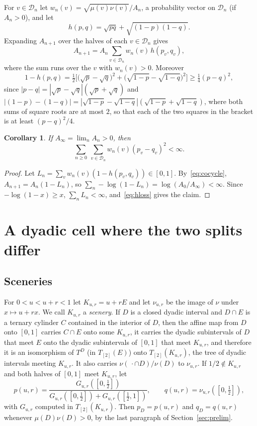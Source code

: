 \documentclass[11pt]{amsart}
\newtheorem{corollary}[theorem]{Corollary}
\theoremstyle{remark}
\newcommand{\cD}{\mathcal D}
\begin{document}
For $v\in\cD_n$ let $w_n(v)=\sqrt{\mu(v)\nu(v)}/A_n$, a probability vector on $\cD_n$ (if $A_n>0$), and let
\[
h(p,q)=\sqrt{pq}+\sqrt{(1-p)(1-q)}.
\]
Expanding $A_{n+1}$ over the halves of each $v\in\cD_n$ gives
\begin{equation}\label{eq:cocycle}
A_{n+1}=A_n\sum_{v\in\cD_n}w_n(v)\,h(p_v,q_v),
\end{equation}
where the sum runs over the $v$ with $w_n(v)>0$. Moreover
\begin{equation}\label{eq:hloss}
1-h(p,q)=\tfrac12\Big[\big(\sqrt p-\sqrt q\big)^2+\big(\sqrt{1-p}-\sqrt{1-q}\big)^2\Big]\ge\tfrac14(p-q)^2,
\end{equation}
since $|p-q|=|\sqrt p-\sqrt q|(\sqrt p+\sqrt q)$ and $|(1-p)-(1-q)|=|\sqrt{1-p}-\sqrt{1-q}|(\sqrt{1-p}+\sqrt{1-q})$, where both sums of square roots are at most $2$, so that each of the two squares in the bracket is at least $(p-q)^2/4$.

\begin{corollary}\label{cor:finite-series}
If $A_\infty=\lim_nA_n>0$, then
\[
\sum_{n\ge0}\ \sum_{v\in\cD_n}w_n(v)(p_v-q_v)^2<\infty.
\]
\end{corollary}

\begin{proof}
Let $L_n=\sum_vw_n(v)(1-h(p_v,q_v))\in[0,1]$. By~\eqref{eq:cocycle}, $A_{n+1}=A_n(1-L_n)$, so $\sum_n-\log(1-L_n)=\log(A_0/A_\infty)<\infty$. Since $-\log(1-x)\ge x$, $\sum_nL_n<\infty$, and~\eqref{eq:hloss} gives the claim.
\end{proof}

\section{A dyadic cell where the two splits differ}\label{sec:gap}

\subsection*{Sceneries}
For $0<u<u+r<1$ let $K_{u,r}=u+rE$ and let $\nu_{u,r}$ be the image of $\nu$ under $x\mapsto u+rx$. We call $K_{u,r}$ a \emph{scenery}. If $D$ is a closed dyadic interval and $D\cap E$ is a ternary cylinder $C$ contained in the interior of $D$, then the affine map from $D$ onto $[0,1]$ carries $C\cap E$ onto some $K_{u,r}$, it carries the dyadic subintervals of $D$ that meet $E$ onto the dyadic subintervals of $[0,1]$ that meet $K_{u,r}$, and therefore it is an isomorphism of $T^D$ (in $T_{[2]}(E)$) onto $T_{[2]}(K_{u,r})$, the tree of dyadic intervals meeting $K_{u,r}$. It also carries $\nu(\,\cdot\cap D)/\nu(D)$ to $\nu_{u,r}$. If $1/2\notin K_{u,r}$ and both halves of $[0,1]$ meet $K_{u,r}$, let
\[
p(u,r)=\frac{G_{u,r}([0,\tfrac12])}{G_{u,r}([0,\tfrac12])+G_{u,r}([\tfrac12,1])},\qquad q(u,r)=\nu_{u,r}([0,\tfrac12]),
\]
with $G_{u,r}$ computed in $T_{[2]}(K_{u,r})$. Then $p_D=p(u,r)$ and $q_D=q(u,r)$ whenever $\mu(D)\nu(D)>0$, by the last paragraph of Section~\ref{sec:prelim}.
\end{document}
